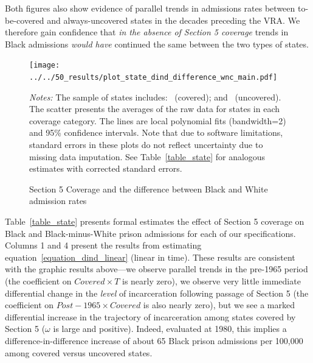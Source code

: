 \documentclass[12pt]{article}
\begin{document}
Both figures also show evidence of parallel trends in admissions rates between to-be-covered and always-uncovered states in the decades preceding the VRA.  We therefore gain confidence that \emph{in the absence of Section 5 coverage} trends in Black admissions \emph{would have} continued the same between the two types of states.




\begin{figure}[t!]
	\begin{center}
	\caption{Section 5 Coverage and the difference between Black and White admission rates}
		\small \vspace*{.05in}
		\smallskip
				\texttt{[image: ../../50\_results/plot\_state\_dind\_difference\_wnc\_main.pdf]}
		\label{figure_state_difference}
		\end{center}
	\scriptsize{\emph{Notes:} The sample of states includes: \unskip~(covered); and \unskip~(uncovered).  The scatter presents the averages of the raw data for states in each coverage category.  The lines are local polynomial fits (bandwidth=2) and 95\% confidence intervals. Note that due to software limitations, standard errors in these plots do not reflect uncertainty due to missing data imputation. See Table~\ref{table_state} for analogous estimates with corrected standard errors.}
\end{figure} \normalsize



Table~\ref{table_state} presents formal estimates the effect of Section 5 coverage on Black and Black-minus-White prison admissions for each of our specifications.  Columns 1 and 4 present the results from estimating equation~\ref{equation_dind_linear} (linear in time). These results are consistent with the graphic results above---we observe parallel trends in the pre-1965 period (the coefficient on $Covered \times T$ is nearly zero), we observe very little immediate differential change in the \emph{level} of incarceration following passage of Section 5 (the coefficient on $Post-1965 \times Covered$ is also nearly zero), but we see a marked differential increase in the trajectory of incarceration among states covered by Section 5 ($\omega$ is large and positive). Indeed, evaluated at 1980, this implies a difference-in-difference increase of about 65 Black prison admissions per 100,000 among covered versus uncovered states.
\end{document}
